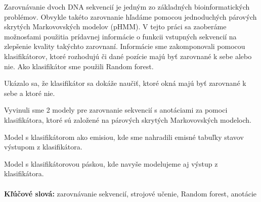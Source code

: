 Zarovnávanie dvoch DNA sekvencií je jedným zo základných
bioinformatických problémov. Obvykle takéto zarovnanie hľadáme pomocou jednoduchých párových skrytých
Markovovských modelov (pHMM). V tejto práci sa zaoberáme možnosťami použitia prídavnej informácie o funkcii vstupných sekvencií na zlepšenie kvality takýchto zarovnaní.
Informácie sme zakomponovali pomocou klasifikátorov, ktoré rozhodujú či dané pozície majú byť zarovnané k sebe alebo nie. Ako klasifikátor sme použili Random forest.

Ukázalo sa, že klasifikátor sa dokáže naučiť, ktoré okná majú byť zarovnané k sebe a ktoré nie.

Vyvinuli sme 2 modely pre zarovnanie sekvencií s anotáciami za pomoci klasifikátora, ktoré sú založené na párových skrytých Markovovských modeloch.

Model s klasifikátorom ako emisiou, kde sme nahradili emisné tabuľky stavov výstupom z klasifikátora.

Model s klasifikátorovou páskou, kde navyše modelujeme aj výstup z klasifikátora.
\\ \\
{\bf Kľúčové slová:} zarovnávanie sekvencií, strojové učenie, Random forest, anotácie
